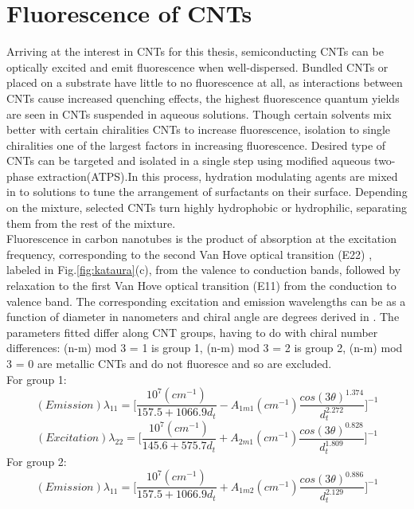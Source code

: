 \section{Fluorescence of CNTs}
Arriving at the interest in CNTs for this thesis, semiconducting CNTs can be optically excited and emit fluorescence\cite{hendler} when well-dispersed. Bundled CNTs or placed on a substrate have little to no fluorescence at all, as interactions between CNTs cause increased quenching effects, the highest fluorescence quantum yields are seen in CNTs suspended in aqueous solutions. Though certain solvents mix better with certain chiralities CNTs to increase fluorescence, isolation to single chiralities one of the largest factors in increasing fluorescence. Desired type of CNTs can be targeted and isolated in a single step using modified aqueous two-phase extraction(ATPS)\cite{turek}.In this process, hydration modulating agents are mixed in to solutions to tune the arrangement of surfactants on their surface. Depending on the mixture, selected CNTs turn highly hydrophobic or hydrophilic, separating them from the rest of the mixture.\\
Fluorescence in carbon nanotubes is the product of absorption at the excitation frequency, corresponding to the second Van Hove optical transition (E22) , labeled in Fig.\ref{fig:kataura}(c), from the valence to conduction bands, followed by relaxation to the first Van Hove optical transition (E11) from the conduction to valence band. The corresponding excitation and emission  wavelengths can be as a function of diameter in nanometers and chiral angle are degrees derived in \cite{bachilo}. The parameters fitted differ along CNT groups, having to do with chiral number differences:  (n-m) mod 3 = 1 is group 1, (n-m) mod 3 = 2 is group 2,  (n-m) mod 3 = 0 are metallic CNTs and do not fluoresce and so are excluded. \\
For group 1:
\begin{equation}
	(Emission)\lambda_{11} = \Bigg[\frac{10^7(cm^{-1})}{157.5+1066.9d_t} - A_{1m1}(cm^{-1})\frac{cos(3\theta)^{1.374}}{d_t^{2.272}} \Bigg]^{-1}
\end{equation}
\begin{equation}
	(Excitation)\lambda_{22} = \Bigg[\frac{10^7(cm^{-1})}{145.6+575.7d_t} + A_{2m1}(cm^{-1})\frac{cos(3\theta)^{0.828}}{d_t^{1.809}} \Bigg]^{-1}
\end{equation}
For group 2:
\begin{equation}
	(Emission)\lambda_{11} = \Bigg[\frac{10^7(cm^{-1})}{157.5+1066.9d_t} + A_{1m2}(cm^{-1})\frac{cos(3\theta)^{0.886}}{d_t^{2.129}} \Bigg]^{-1}
\end{equation}
